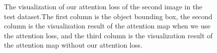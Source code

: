 \begin{figure}[h!]
{\begin{minipage}[t]{5cm}
	\end{minipage}}
	
	\caption[The visualization of our attention loss of the second image in the test dataset]{The visualization of our attention loss of the second image in the test dataset.The first column is the object bounding box, the second column is the visualization result of the attention map when we use the attention loss, and the third column is the visualization result of the attention map without our attention loss.}
	\label{fig:bus}
\end{figure}



